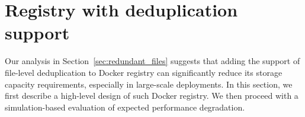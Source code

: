 \section{Registry with deduplication support}
\label{sec:file_adressable}

Our analysis in Section~\ref{sec:redundant_files} suggests that adding the
support of file-level deduplication to Docker registry can significantly reduce
its storage capacity requirements, especially in large-scale deployments.
%
In this section, we first describe a high-level design of such Docker registry.
%
We then proceed with a simulation-based evaluation of expected performance
degradation.






